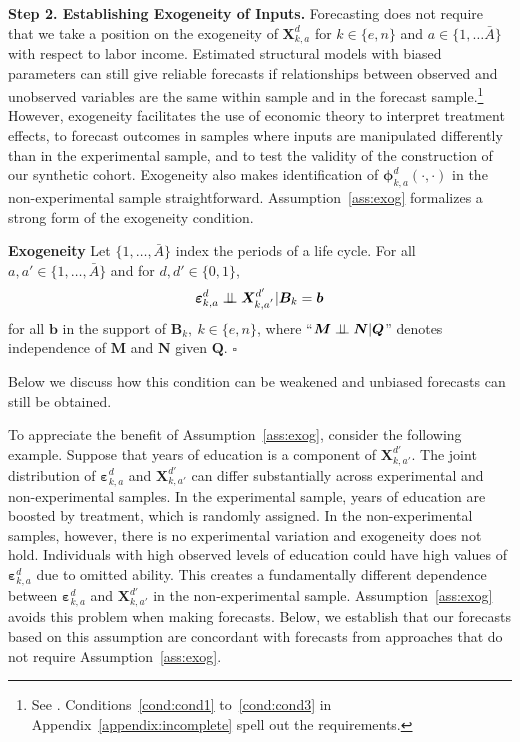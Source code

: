 \begin{figure}
\end{figure}

\textbf{Step 2. Establishing Exogeneity of Inputs.} Forecasting does not require that we take a position on the exogeneity of $\bm{X}^d_{k,a}$ for $k \in \{e,n\}$ and $a \in \{ 1, \ldots \bar{A} \}$ with respect to labor income. Estimated structural models with biased parameters can still give reliable forecasts if relationships between observed and unobserved variables are the same within sample and in the forecast sample.\footnote{See \cite{Liu-etal-2016-USC-Data-Models}.  Conditions~\ref{cond:cond1} to~\ref{cond:cond3} in Appendix~\ref{appendix:incomplete} spell out the requirements.} However, exogeneity facilitates the use of economic theory to interpret treatment effects, to forecast outcomes in samples where inputs are manipulated differently than in the experimental sample, and to test the validity of the construction of our synthetic cohort. Exogeneity also makes identification of $\bm{\phi}^d_{k,a}\left( \cdot, \cdot \right)$ in the non-experimental sample straightforward. Assumption~\ref{ass:exog} formalizes a strong form of the exogeneity condition.

\onehalfspacing
\begin{assumption}\label{ass:exog} \textbf{Exogeneity}
Let $\{ 1, \ldots, \bar{A} \}$ index the periods of a life cycle. For all $a, a' \in \{ 1, \ldots, \bar{A} \}$ and for $d, d' \in \{0,1\}$,
\begin{equation}
\bm{\varepsilon}^d_{k,a} \perp\!\!\!\perp \bm{X}^{d^{\prime}}_{k,a^{'}} | \bm{B}_k = \bm{b}
\end{equation}
for all $\bm{b}$ in the support of $\bm{B}_k, \: k \in \{e,n\}$, where ``$\bm{M} \perp\!\!\!\perp \bm{N}|\bm{Q}$'' denotes independence of $\bm{M}$ and $\bm{N}$ given $\bm{Q}$. $\square$
\end{assumption}
\doublespacing
Below we discuss how this condition can be weakened and unbiased forecasts can still be obtained.

To appreciate the benefit of Assumption~\ref{ass:exog}, consider the following example. Suppose that years of education is a component of $\bm{X}^{d'}_{k,{a'}}$. The joint distribution of $\bm{\varepsilon}_{k,a}^d$ and $\bm{X}^{d'}_{k,{a'}}$ can differ substantially across experimental and non-experimental samples. In the experimental sample, years of education are boosted by treatment, which is randomly assigned. In the non-experimental samples, however, there is no experimental variation and exogeneity does not hold. Individuals with high observed levels of education could have high values of $\bm{\varepsilon}_{k,a}^d$ due to omitted ability. This creates a fundamentally different dependence between $\bm{\varepsilon}_{k,a}^d$ and $\bm{X}_{k,{a'}}^{d'}$ in the non-experimental sample. Assumption~\ref{ass:exog} avoids this problem when making forecasts. Below, we establish that our forecasts based on this assumption are concordant with forecasts from approaches that do not require Assumption~\ref{ass:exog}.

